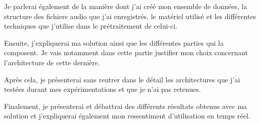 Je parlerai également de la manière dont j'ai créé mon ensemble de données, la structure des fichiers audio que j'ai enregistrés, le matériel utilisé et les différentes techniques que j'utilise dans le prétraitement de celui-ci.

Ensuite, j'expliquerai ma solution ainsi que les différentes parties qui la composent. Je vais notamment dans cette partie justifier mon choix concernant l'architecture de cette dernière.

Après cela, je présenterai sans rentrer dans le détail les architectures que j'ai testées durant mes expérimentations et que je n'ai pas retenues.

Finalement, je présenterai et débattrai des différents résultats obtenus avec ma solution et j'expliquerai également mon ressentiment d'utilisation en temps réel.